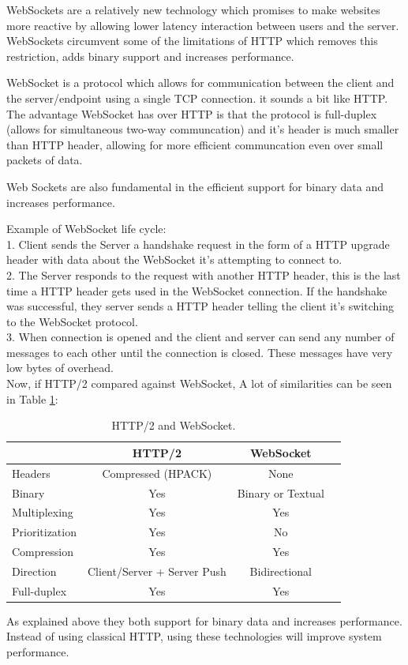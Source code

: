 WebSockets\citep{Ontology:matching} are a relatively new technology which promises to make websites more reactive by allowing lower latency interaction between users and the server. WebSockets circumvent some of the limitations of HTTP which removes this restriction, adds binary support and increases performance.

WebSocket is a protocol which allows for communication between the client and the server/endpoint using a single TCP connection. it sounds a bit like HTTP. The advantage WebSocket has over HTTP is that the protocol is full-duplex (allows for simultaneous two-way communcation) and it’s header is much smaller than HTTP header, allowing for more efficient communcation even over small packets of data.

Web Sockets are also fundamental in the efficient support for binary data and increases performance.

Example of WebSocket life cycle:\citep{thesis:state7}\\
1. Client sends the Server a handshake request in the form of a HTTP upgrade header with data about the WebSocket
it’s attempting to connect to.\\
2. The Server responds to the request with another HTTP header, this is the last time a HTTP header gets used in the WebSocket connection. If the handshake was successful, they server sends a HTTP header telling the client it’s switching to the WebSocket protocol.\\
3. When connection is opened and the client and server can send any number of messages to each other
until the connection is closed. These messages have very low bytes of overhead.\\

Now, if HTTP/2 compared against WebSocket\citep{thesis:state11}, A lot of similarities can be seen in Table \ref{tab:websocket}:
\begin{table}[!htb]
  \renewcommand{\arraystretch}{1.2} %
  \centering
  \begin{tabular}{lccc}
    \toprule
                   & HTTP/2                      & WebSocket  \\
    \midrule
    Headers        & Compressed (HPACK)          & None\\
    Binary         & Yes                         & Binary or Textual\\
    Multiplexing   & Yes                         & Yes\\
    Prioritization & Yes                         & No\\
    Compression    & Yes                         & Yes\\
    Direction      & Client/Server + Server Push & Bidirectional\\
    Full-duplex    & Yes                         & Yes\\

    \bottomrule
  \end{tabular}
  \caption[HTTP/2 and WebSocket.]{HTTP/2 and WebSocket.}
  \label{tab:websocket}
\end{table}

As explained above they both support for binary data and increases performance. Instead of using classical HTTP, using these technologies will improve system performance.
